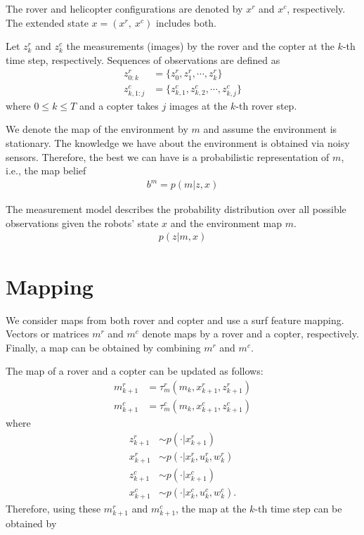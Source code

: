 \documentclass[conference]{IEEEtran}
\begin{document}
The rover and helicopter configurations are denoted by $x^r$ and $x^c$, respectively. The extended state $x=(x^r,~x^c)$ includes both.

Let $z^r_k$ and $z^c_k$ the measurements (images) by the rover and the copter at the $k$-th time step, respectively. Sequences of observations are defined as
\begin{align}
    z^r_{0:k}&=\{z^r_0,z^r_1,\cdots,z^r_k\}\\
    z^c_{k,1:j}&=\{z^c_{k,1},z^c_{k,2},\cdots,z^c_{k,j}\}
\end{align}
where $0 \leq k \leq T$ and a copter takes $j$ images at the $k$-th rover step.

We denote the map of the environment by $m$ and assume the environment is stationary. The knowledge we have about the environment is obtained via noisy sensors. Therefore, the best we can have is a probabilistic representation of $m$, i.e., the map belief
\begin{align}
    b^m=p(m|z, x)
\end{align}

The measurement model describes the probability distribution over all possible observations given the robots' state $x$ and the environment map $m$.
\begin{align}
    p(z|m, x)
\end{align}




\section{Mapping}

We consider maps from both rover and copter and use a surf feature mapping. Vectors or matrices $m^r$ and $m^c$ denote maps by a rover and a copter, respectively. Finally, a map can be obtained by combining $m^r$ and $m^c$.

The map of a rover and a copter can be updated as follows:
\begin{align}
    m^r_{k+1}&=\tau^r_m (m_k, x^r_{k+1}, z^r_{k+1})\\
    m^c_{k+1}&=\tau^c_m (m_k, x^c_{k+1}, z^c_{k+1})
\end{align}
where
\begin{align}
    z^r_{k+1} &\sim p(\cdot |x^r_{k+1})\\
    x^r_{k+1} &\sim p(\cdot |x^r_k, u^r_k, w^r_k)\\
    z^c_{k+1} &\sim p(\cdot |x^c_{k+1})\\
    x^c_{k+1} &\sim p(\cdot |x^c_k, u^c_k, w^c_k).
\end{align}
Therefore, using these $m^r_{k+1}$ and $m^c_{k+1}$, the map at the $k$-th time step can be obtained by
\end{document}
